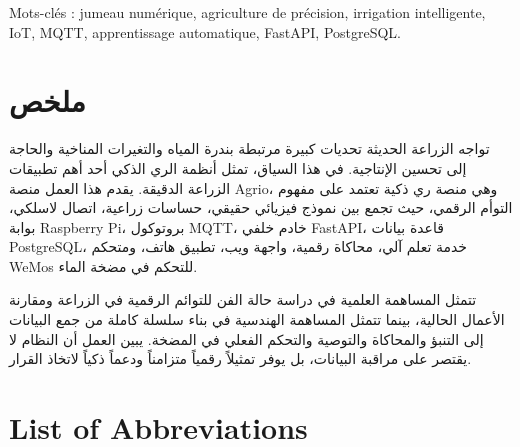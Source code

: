 Mots-clés : jumeau numérique, agriculture de précision, irrigation intelligente, IoT, MQTT, apprentissage automatique, FastAPI, PostgreSQL.

\chapter*{\texorpdfstring{\textarabic{ملخص}}{Arabic summary}}

\begin{Arabic}
تواجه الزراعة الحديثة تحديات كبيرة مرتبطة بندرة المياه والتغيرات المناخية والحاجة إلى تحسين الإنتاجية. في هذا السياق، تمثل أنظمة الري الذكي أحد أهم تطبيقات الزراعة الدقيقة. يقدم هذا العمل منصة Agrio، وهي منصة ري ذكية تعتمد على مفهوم التوأم الرقمي، حيث تجمع بين نموذج فيزيائي حقيقي، حساسات زراعية، اتصال لاسلكي، بوابة Raspberry Pi، بروتوكول MQTT، خادم خلفي FastAPI، قاعدة بيانات PostgreSQL، خدمة تعلم آلي، محاكاة رقمية، واجهة ويب، تطبيق هاتف، ومتحكم WeMos للتحكم في مضخة الماء.
\end{Arabic}

\begin{Arabic}
تتمثل المساهمة العلمية في دراسة حالة الفن للتوائم الرقمية في الزراعة ومقارنة الأعمال الحالية، بينما تتمثل المساهمة الهندسية في بناء سلسلة كاملة من جمع البيانات إلى التنبؤ والمحاكاة والتوصية والتحكم الفعلي في المضخة. يبين العمل أن النظام لا يقتصر على مراقبة البيانات، بل يوفر تمثيلاً رقمياً متزامناً ودعماً ذكياً لاتخاذ القرار.
\end{Arabic}

\chapter*{List of Abbreviations}

